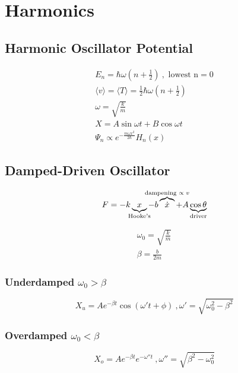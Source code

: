 \documentclass[10pt,letter]{article}
\begin{document}

\section{Harmonics}
\subsection{Harmonic Oscillator Potential}
\begin{align}
    E_n = \hbar \omega\left( n + \frac{1}{2} \right) ~,\textrm{ lowest n} =0\\
    \langle v \rangle = \langle T \rangle = \frac{1}{2}\hbar \omega \left( n + \frac{1}{2} \right) \\
    \omega = \sqrt{ \frac{k}{m}}\\
    X = A \sin \omega t + B \cos \omega t\\
    \Psi_n \propto e^{-\frac{m\omega x^2}{2\hbar}}H_n(x)
\end{align}

\subsection{Damped-Driven Oscillator}
\begin{equation}
 F = -k\underbrace{x}_{\mathclap{\textrm{Hooke's}}} -b\overbrace{\dot{x}}^{\mathclap{\textrm{dampening $\propto v$}}} + A\underbrace{\cos \theta}_{\mathclap{\textrm{driver}}}
\end{equation}

\begin{align}
 \omega_0 = \sqrt{\frac{k}{m}}\\
 \beta = \frac{b}{2m}
\end{align}

\subsubsection{Underdamped $\omega_0 > \beta$}
\begin{equation}
  X_u = Ae^{-\beta t} \cos (\omega't + \phi)    ~, \omega' = \sqrt{\omega_0^2 - \beta^2}
\end{equation}

\subsubsection{Overdamped $\omega_0 < \beta$}
\begin{equation}
 X_o = Ae^{-\beta t} e^{-\omega''t}     ~, \omega'' = \sqrt{\beta^2 - \omega_0^2}
\end{equation}
\end{document}
